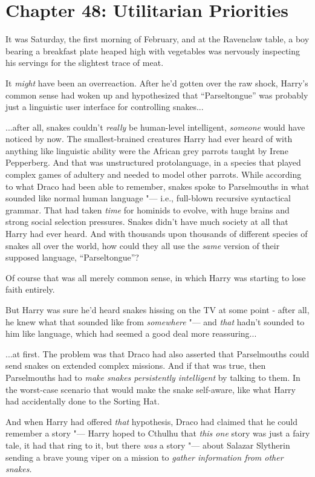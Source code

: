 \chapter{Chapter 48: Utilitarian Priorities}
It was Saturday, the first morning of February, and at the Ravenclaw
table, a boy bearing a breakfast plate heaped high with vegetables was
nervously inspecting his servings for the slightest trace of meat.

It \emph{might} have been an overreaction. After he'd gotten over the
raw shock, Harry's common sense had woken up and hypothesized that
``Parseltongue'' was probably just a linguistic user interface for
controlling snakes...

...after all, snakes couldn't \emph{really} be human-level
intelligent, \emph{someone} would have noticed by now. The
smallest-brained creatures Harry had ever heard of with anything like
linguistic ability were the African grey parrots taught by Irene
Pepperberg. And that was unstructured protolanguage, in a species that
played complex games of adultery and needed to model other parrots.
While according to what Draco had been able to remember, snakes spoke to
Parselmouths in what sounded like normal human language "--- i.e.,
full-blown recursive syntactical grammar. That had taken \emph{time} for
hominids to evolve, with huge brains and strong social selection
pressures. Snakes didn't have much society at all that Harry had ever
heard. And with thousands upon thousands of different species of snakes
all over the world, how could they all use the \emph{same} version of
their supposed language, ``Parseltongue''?

Of course that was all merely common sense, in which Harry was starting
to lose faith entirely.

But Harry was sure he'd heard snakes hissing on the TV at some point -
after all, he knew what that sounded like from \emph{somewhere} "--- and
\emph{that} hadn't sounded to him like language, which had seemed a good
deal more reassuring...

...at first. The problem was that Draco had also asserted that
Parselmouths could send snakes on extended complex missions. And if that
was true, then Parselmouths had to \emph{make snakes persistently
intelligent} by talking to them. In the worst-case scenario that would
make the snake self-aware, like what Harry had accidentally done to the
Sorting Hat.

And when Harry had offered \emph{that} hypothesis, Draco had claimed
that he could remember a story "--- Harry hoped to Cthulhu that \emph{this
one} story was just a fairy tale, it had that ring to it, but there
\emph{was} a story "--- about Salazar Slytherin sending a brave young viper
on a mission to \emph{gather information from other snakes.}

